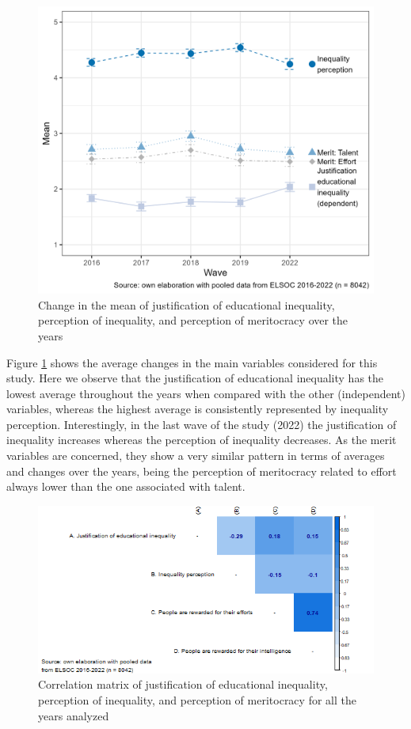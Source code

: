 \documentclass[
  12pt,
  a4paper,
]{article}
\begin{document}
\begin{figure}[H]

{\centering \includegraphics[width=0.85\linewidth]{output/graphs/years_plot} 

}

\caption{Change in the mean of justification of educational inequality, perception of inequality, and perception of meritocracy over the years}\label{fig:means}
\end{figure}

Figure \ref{fig:means} shows the average changes in the main variables considered for this study. Here we observe that the justification of educational inequality has the lowest average throughout the years when compared with the other (independent) variables, whereas the highest average is consistently represented by inequality perception. Interestingly, in the last wave of the study (2022) the justification of inequality increases whereas the perception of inequality decreases. As the merit variables are concerned, they show a very similar pattern in terms of averages and changes over the years, being the perception of meritocracy related to effort always lower than the one associated with talent.

\begin{figure}[H]

{\centering \includegraphics[width=0.85\linewidth]{output/graphs/corr} 

}

\caption{Correlation matrix of justification of educational inequality, perception of inequality, and perception of meritocracy for all the years analyzed}\label{fig:correlation}
\end{figure}
\end{document}
